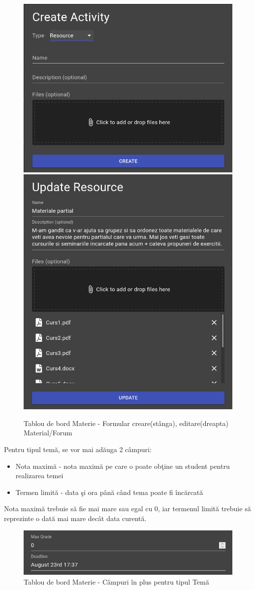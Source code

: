 \documentclass[12pt, a4paper, oneside, romanian]{teza-upb}
\begin{document}
\begin{figure}[H]
\centering
\includegraphics*[width=0.45\columnwidth]{tablou-de-bord-materie-formular-creare-material}
\includegraphics*[width=0.45\columnwidth]{tablou-de-bord-materie-formular-editare-material}
\caption{Tablou de bord Materie - Formular creare(stânga), editare(dreapta) Material/Forum}
\label{tablou-de-bord-materie-formular-material}
\end{figure}

Pentru tipul temă, se vor mai adăuga 2 câmpuri:
\begin{itemize}
	\item Nota maximă - nota maximă pe care o poate obţine un student pentru realizarea temei
	\item Termen limită - data şi ora până când tema poate fi încărcată
\end{itemize}
Nota maximă trebuie să fie mai mare sau egal cu 0, iar termenul limită trebuie să reprezinte o dată mai mare decât data curentă.

\begin{figure}[H]
\centering
\includegraphics*[width=0.8\columnwidth]{tablou-de-bord-materie-campuri-tema}
\caption{Tablou de bord Materie - Câmpuri în plus pentru tipul Temă}
\label{tablou-de-bord-materie-campuri-tema}
\end{figure}
\end{document}
